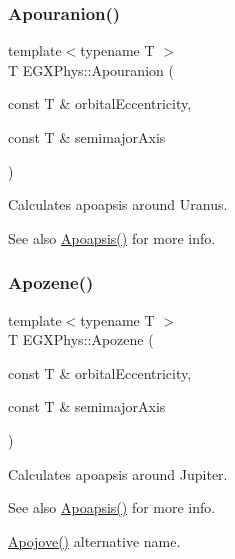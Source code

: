 \subsubsection{\texorpdfstring{Apouranion()}{Apouranion()}}
{\footnotesize\ttfamily template$<$typename T $>$ \\
T E\+G\+X\+Phys\+::\+Apouranion (\begin{DoxyParamCaption}\item[{const T \&}]{orbital\+Eccentricity,  }\item[{const T \&}]{semimajor\+Axis }\end{DoxyParamCaption})}



Calculates apoapsis around Uranus. 

\begin{DoxySeeAlso}{See also}
\hyperlink{group___e_g_x_phys-_apoapsis_gaf962e650bf84a568458e8eb39b1c61ba}{Apoapsis()} for more info. 
\end{DoxySeeAlso}
\mbox{\label{group___e_g_x_phys-_apoapsis_ga44d3dd8d8b350d053b25b7b1f1e15534}} 
\subsubsection{\texorpdfstring{Apozene()}{Apozene()}}
{\footnotesize\ttfamily template$<$typename T $>$ \\
T E\+G\+X\+Phys\+::\+Apozene (\begin{DoxyParamCaption}\item[{const T \&}]{orbital\+Eccentricity,  }\item[{const T \&}]{semimajor\+Axis }\end{DoxyParamCaption})}



Calculates apoapsis around Jupiter. 

\begin{DoxySeeAlso}{See also}
\hyperlink{group___e_g_x_phys-_apoapsis_gaf962e650bf84a568458e8eb39b1c61ba}{Apoapsis()} for more info. 

\hyperlink{group___e_g_x_phys-_apoapsis_ga5a45d0a873514113aaa0adc95aefbbde}{Apojove()} alternative name. 
\end{DoxySeeAlso}
